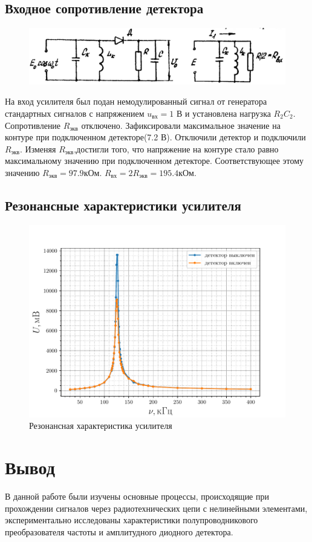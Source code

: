 \subsection{Входное сопротивление детектора}
\begin{figure}[H]
	\centering
	\includegraphics[width=.7\linewidth]{picture/pic12.jpg}
	\caption{}
	\label{pic:12}
\end{figure}
На вход усилителя был подан немодулированный сигнал от генератора стандартных
сигналов с напряжением $u_{\text{вх}} = 1\text{ В}$ и установлена нагрузка $R_2 C_2$. Сопротивление $R_{\text{экв}}$
отключено. Зафиксировали максимальное значение на контуре при подключенном детекторе(7.2 В). Отключили детектор и
подключили $R_{\text{экв}}$. Изменяя $R_{\text{экв}}$,достигли того, что напряжение на контуре стало равно максимальному
значению при подключенном детекторе. Соответствующее этому значению $R_{\text{экв}} =97.9 \text{кОм}$. $R_{\text{вх}} =
2R_{\text{экв}} = 195.4\text{кОм}$. 

\subsection{Резонансные характеристики усилителя}


 \begin{figure}[H]
 	\centering
 	\includegraphics[width=.9\linewidth]{fig/exp3c.pdf}
 	\caption{Резонансная характеристика усилителя}
 	\label{exp:3.4}
 \end{figure}
\section{Вывод}
В данной работе были изучены основные процессы, происходящие при прохождении сигналов через радиотехнических цепи с нелинейными элементами, экспериментально исследованы характеристики полупроводникового преобразователя частоты и амплитудного диодного детектора. 



